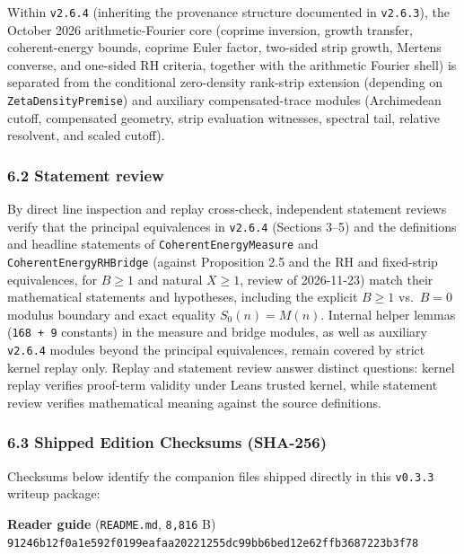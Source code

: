 \documentclass[11pt]{article}
\begin{document}
Within \texttt{v2.6.4} (inheriting the provenance structure documented in \texttt{v2.6.3}), the October 2026 arithmetic-Fourier core (coprime inversion, growth transfer, coherent-energy bounds, coprime Euler factor, two-sided strip growth, Mertens converse, and one-sided RH criteria, together with the arithmetic Fourier shell) is separated from the conditional zero-density rank-strip extension (depending on \texttt{ZetaDensityPremise}) and auxiliary compensated-trace modules (Archimedean cutoff, compensated geometry, strip evaluation witnesses, spectral tail, relative resolvent, and scaled cutoff).

\subsubsection{6.2 Statement review}\label{62-statement-review}

By direct line inspection and replay cross-check, independent statement reviews verify that the principal equivalences in \texttt{v2.6.4} (Sections 3--5) and the definitions and headline statements of \texttt{CoherentEnergyMeasure} and \texttt{CoherentEnergyRHBridge} (against Proposition 2.5 and the RH and fixed-strip equivalences, for \(B \ge 1\) and natural \(X \ge 1\), review of 2026-11-23) match their mathematical statements and hypotheses, including the explicit \(B \ge 1\) vs.\ \(B = 0\) modulus boundary and exact equality \(S_0(n) = M(n)\). Internal helper lemmas (\texttt{168 + 9} constants) in the measure and bridge modules, as well as auxiliary \texttt{v2.6.4} modules beyond the principal equivalences, remain covered by strict kernel replay only. Replay and statement review answer distinct questions: kernel replay verifies proof-term validity under Lean\textquotesingle s trusted kernel, while statement review verifies mathematical meaning against the source definitions.

\subsubsection{6.3 Shipped Edition Checksums (SHA-256)}\label{63-shipped-edition-checksums-sha-256}

Checksums below identify the companion files shipped directly in this \texttt{v0.3.3} writeup package:

\textbf{Reader guide} (\texttt{README.md}, \texttt{8,816} B)\\
\texttt{91246b12\allowbreak{}f0a1e592\allowbreak{}f0199eaf\allowbreak{}aa202212\allowbreak{}55dc99bb\allowbreak{}6bed12e6\allowbreak{}2ffb3687\allowbreak{}223b3f78}
\end{document}
